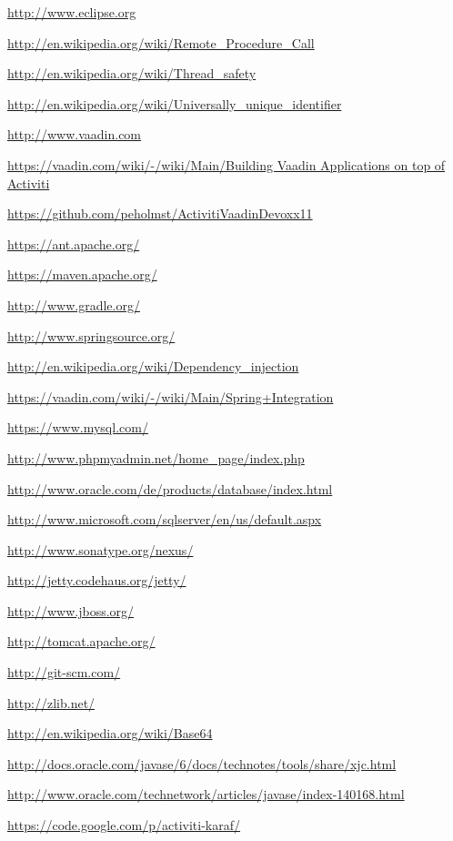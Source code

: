 \documentclass[paper=a4,twoside=false,BCOR=0mm,DIV=calc,fontsize=12pt]{scrartcl}
\begin{document}
\begin{thebibliography}{99}
 \url{http://www.eclipse.org} %

 \url{http://en.wikipedia.org/wiki/Remote_Procedure_Call}

 \url{http://en.wikipedia.org/wiki/Thread_safety}

 \url{http://en.wikipedia.org/wiki/Universally_unique_identifier}

 \url{http://www.vaadin.com}

 \url{https://vaadin.com/wiki/-/wiki/Main/Building Vaadin Applications on top of Activiti}

 \url{https://github.com/peholmst/ActivitiVaadinDevoxx11}

 \url{https://ant.apache.org/}

 \url{https://maven.apache.org/}

 \url{http://www.gradle.org/}

 \url{http://www.springsource.org/}

 \url{http://en.wikipedia.org/wiki/Dependency_injection}

 \url{https://vaadin.com/wiki/-/wiki/Main/Spring+Integration}

 \url{https://www.mysql.com/}

 \url{http://www.phpmyadmin.net/home_page/index.php}

 \url{http://www.oracle.com/de/products/database/index.html}

 \url{http://www.microsoft.com/sqlserver/en/us/default.aspx}

 \url{http://www.sonatype.org/nexus/}

 \url{http://jetty.codehaus.org/jetty/}

 \url{http://www.jboss.org/}

 \url{http://tomcat.apache.org/}

 \url{http://git-scm.com/}

 \url{http://zlib.net/}

 \url{http://en.wikipedia.org/wiki/Base64}

 \url{http://docs.oracle.com/javase/6/docs/technotes/tools/share/xjc.html}

 \url{http://www.oracle.com/technetwork/articles/javase/index-140168.html}

 \url{https://code.google.com/p/activiti-karaf/}

\end{thebibliography}
\end{document}
